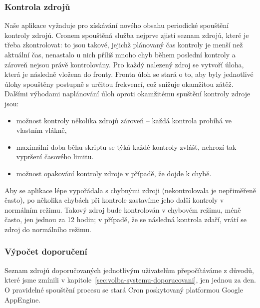 \subsubsection{Kontrola zdrojů}

Naše aplikace vyžaduje pro získávání nového obsahu periodické spouštění kontroly zdrojů.
Cronem spouštěná služba nejprve zjistí seznam zdrojů, které je třeba zkontrolovat: to jsou takové, jejichž plánovaný čas kontroly je menší než aktuální čas, nenastalo u nich příliš mnoho chyb během poslední kontroly a zároveň nejsou právě kontrolovány.
Pro každý nalezený zdroj se vytvoří úloha, která je následně vložena do fronty.
Fronta úloh se stará o to, aby byly jednotlivé úlohy spouštěny postupně s určitou frekvencí, což snižuje okamžitou zátěž.
Dalšími výhodami naplánování úloh oproti okamžitému spuštění kontroly zdroje jsou:
\begin{itemize}
	\item možnost kontroly několika zdrojů zároveň -- každá kontrola probíhá ve vlastním vlákně,
	\item maximální doba běhu skriptu se týká každé kontroly zvlášť, nehrozí tak vypršení časového limitu.
	\item možnost opakování kontroly zdroje v případě, že dojde k chybě.
\end{itemize}

Aby se aplikace lépe vypořádala s chybnými zdroji (nekontrolovala je nepřiměřeně často), po několika chybách při kontrole zastavíme jeho další kontroly v normálním režimu.
Takový zdroj bude kontrolován v chybovém režimu, méně často, jen jednou za 12 hodin; v případě, že se následná kontrola zdaří, vrátí se zdroj do normálního režimu.

\subsubsection{Výpočet doporučení}

Seznam zdrojů doporučovaných jednotlivým uživatelům přepočítáváme z důvodů, které jsme zmínili v kapitole~\ref{sec:volba-systemu-doporucovani}, jen jednou za den.
O pravidelné spouštění procesu se stará Cron poskytovaný platformou Google AppEngine.

